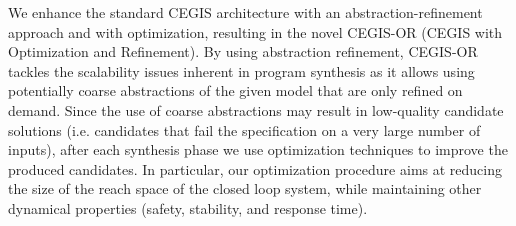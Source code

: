 \documentclass[sigconf]{llncs}
\begin{document}
%
We enhance the standard CEGIS architecture 
with an abstraction-refinement approach and with optimization,
resulting in the novel CEGIS-OR (CEGIS with Optimization and
Refinement).  By using abstraction refinement, CEGIS-OR tackles the
scalability issues inherent in program synthesis as it allows using
potentially coarse abstractions of the given model that are only
refined on demand.  Since the use of coarse abstractions may result in
low-quality candidate solutions (i.e. candidates that fail the
specification on a very large number of inputs), after each synthesis
phase we use optimization techniques to improve the produced
candidates.  In particular, our optimization procedure aims at
reducing the size of the reach space of the closed loop system, while
maintaining other dynamical properties (safety, stability, and
response time).

\end{document}
